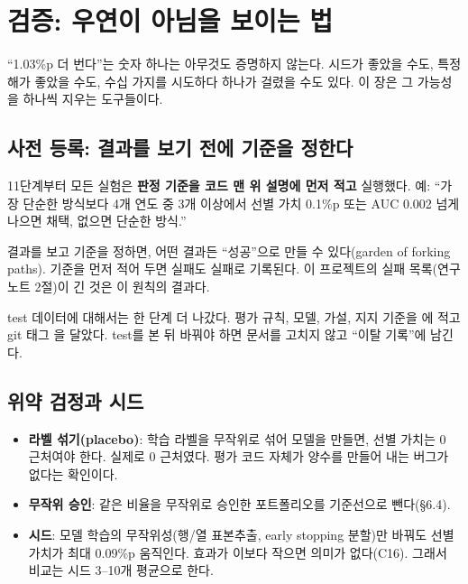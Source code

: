 \chapter{검증: 우연이 아님을 보이는 법}

``1.03\%p 더 번다''는 숫자 하나는 아무것도 증명하지 않는다. 시드가 좋았을 수도, 특정 해가 좋았을 수도, 수십 가지를 시도하다 하나가 걸렸을 수도 있다. 이 장은 그 가능성을 하나씩 지우는 도구들이다.

\section{사전 등록: 결과를 보기 전에 기준을 정한다}
11단계부터 모든 실험은 \textbf{판정 기준을 코드 맨 위 설명에 먼저 적고} 실행했다. 예: ``가장 단순한 방식보다 4개 연도 중 3개 이상에서 선별 가치 0.1\%p 또는 AUC 0.002 넘게 나으면 채택, 없으면 단순한 방식.''

\begin{keybox}[왜 중요한가]
결과를 보고 기준을 정하면, 어떤 결과든 ``성공''으로 만들 수 있다(garden of forking paths). 기준을 먼저 적어 두면 실패도 실패로 기록된다. 이 프로젝트의 실패 목록(연구 노트 2절)이 긴 것은 이 원칙의 결과다.
\end{keybox}

test 데이터에 대해서는 한 단계 더 나갔다. 평가 규칙, 모델, 가설, 지지 기준을 에 적고 git 태그 을 달았다. test를 본 뒤 바꿔야 하면 문서를 고치지 않고 ``이탈 기록''에 남긴다.

\section{위약 검정과 시드}
\begin{itemize}[leftmargin=*]
\item \textbf{라벨 섞기(placebo)}: 학습 라벨을 무작위로 섞어 모델을 만들면, 선별 가치는 0 근처여야 한다. 실제로 0 근처였다. 평가 코드 자체가 양수를 만들어 내는 버그가 없다는 확인이다.
\item \textbf{무작위 승인}: 같은 비율을 무작위로 승인한 포트폴리오를 기준선으로 뺀다(\S6.4).
\item \textbf{시드}: 모델 학습의 무작위성(행/열 표본추출, early stopping 분할)만 바꿔도 선별 가치가 최대 0.09\%p 움직인다. 효과가 이보다 작으면 의미가 없다(C16). 그래서 비교는 시드 3--10개 평균으로 한다.
\end{itemize}

